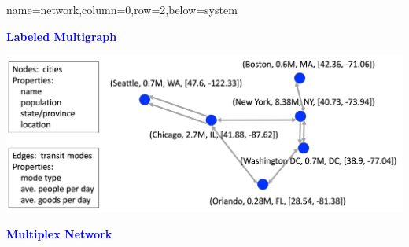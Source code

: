 \documentclass[landscape,paperwidth=70in,paperheight=46in,fontscale=0.225]{baposter} %
\begin{document}
\begin{poster}
          {name=network,column=0,row=2,below=system}{         

\begin{minipage}{.5\textwidth}
\begin{center}
\textcolor{blue}{\textbf{Labeled Multigraph}}
\end{center}
\vspace{3mm}

\centering
\includegraphics[scale=0.25]{figures/single_net.png}
\end{minipage}
\hfill
 \begin{minipage}{.35\textwidth}   
 \textcolor{blue}{\textbf{Multiplex Network}}
 \vspace{3mm}
 

\end{minipage}}
\end{poster}
\end{document}
